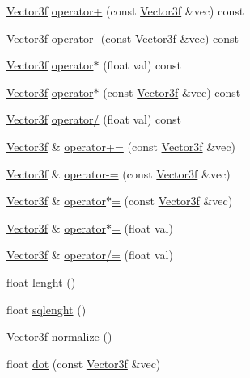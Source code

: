 \begin{DoxyCompactItemize}
\item 
\hyperlink{classh2_1_1_vector3f}{Vector3f} \hyperlink{classh2_1_1_vector3f_a81b3ff01924fb01ba355189cebd61c53}{operator+} (const \hyperlink{classh2_1_1_vector3f}{Vector3f} \&vec) const 
\item 
\hyperlink{classh2_1_1_vector3f}{Vector3f} \hyperlink{classh2_1_1_vector3f_a639b6112fb6f30be32883637164f926e}{operator-\/} (const \hyperlink{classh2_1_1_vector3f}{Vector3f} \&vec) const 
\item 
\hyperlink{classh2_1_1_vector3f}{Vector3f} \hyperlink{classh2_1_1_vector3f_a5f1c72b926f959b6ee3559b8d949d24c}{operator$\ast$} (float val) const 
\item 
\hyperlink{classh2_1_1_vector3f}{Vector3f} \hyperlink{classh2_1_1_vector3f_a70bfccc2f01d274737c9afc0554b5d80}{operator$\ast$} (const \hyperlink{classh2_1_1_vector3f}{Vector3f} \&vec) const 
\item 
\hyperlink{classh2_1_1_vector3f}{Vector3f} \hyperlink{classh2_1_1_vector3f_ab09c80268fd5bd168e1ee17740d6433c}{operator/} (float val) const 
\item 
\hyperlink{classh2_1_1_vector3f}{Vector3f} \& \hyperlink{classh2_1_1_vector3f_a437c458990a56c903eba1d946a2bd41f}{operator+=} (const \hyperlink{classh2_1_1_vector3f}{Vector3f} \&vec)
\item 
\hyperlink{classh2_1_1_vector3f}{Vector3f} \& \hyperlink{classh2_1_1_vector3f_adae678053cd104d9c8daa0308329e716}{operator-\/=} (const \hyperlink{classh2_1_1_vector3f}{Vector3f} \&vec)
\item 
\hyperlink{classh2_1_1_vector3f}{Vector3f} \& \hyperlink{classh2_1_1_vector3f_a8c5c5cd642d2563c9d49826f143856a1}{operator$\ast$=} (const \hyperlink{classh2_1_1_vector3f}{Vector3f} \&vec)
\item 
\hyperlink{classh2_1_1_vector3f}{Vector3f} \& \hyperlink{classh2_1_1_vector3f_a2f2407073e67c80b7718f8d9656b0f44}{operator$\ast$=} (float val)
\item 
\hyperlink{classh2_1_1_vector3f}{Vector3f} \& \hyperlink{classh2_1_1_vector3f_af65380efe85bcfabfa0d4a5ed9e3f06a}{operator/=} (float val)
\item 
float \hyperlink{classh2_1_1_vector3f_a16181c8989618115df59ffa1de87ab3d}{lenght} ()
\item 
float \hyperlink{classh2_1_1_vector3f_ac91e9af67244d22656561f2086b8b5d8}{sqlenght} ()
\item 
\hyperlink{classh2_1_1_vector3f}{Vector3f} \hyperlink{classh2_1_1_vector3f_a36dafb146631aa3fe08a1027100a3e80}{normalize} ()
\item 
float \hyperlink{classh2_1_1_vector3f_a270cd39b555e8926b9cc5c99670536a2}{dot} (const \hyperlink{classh2_1_1_vector3f}{Vector3f} \&vec)
\end{DoxyCompactItemize}
